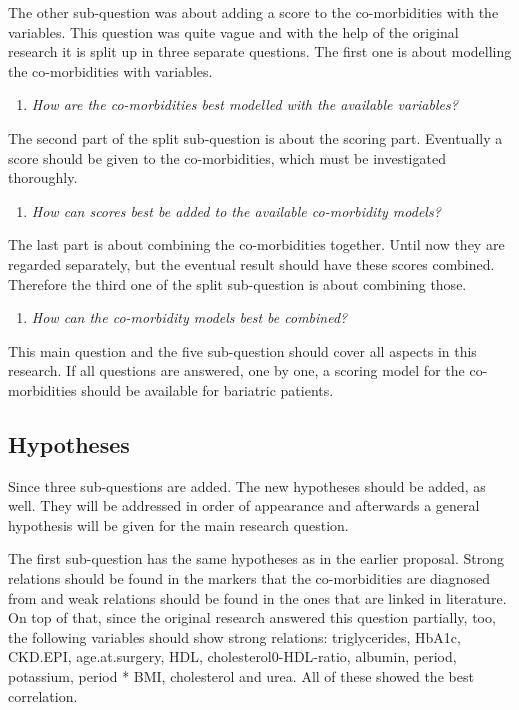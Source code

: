 \documentclass[10pt,a4paper]{article}
\begin{document}
	The other sub-question was about adding a score to the co-morbidities with the variables. This question was quite vague and with the help of the original research it is split up in three separate questions. The first one is about modelling the co-morbidities with variables.
	
	\begin{enumerate}[resume]
		\item \emph{How are the co-morbidities best modelled with the available variables?}
	\end{enumerate}
	
	The second part of the split sub-question is about the scoring part. Eventually a score should be given to the co-morbidities, which  must be investigated thoroughly.
	
	\begin{enumerate}[resume]
		\item \emph{How can scores best be added to the available co-morbidity models?}
	\end{enumerate}
	
	The last part is about combining the co-morbidities together. Until now they are regarded separately, but the eventual result should have these scores combined. Therefore the third one of the split sub-question is about combining those.
	
	\begin{enumerate}[resume]
		\item \emph{How can the co-morbidity models best be combined?}
	\end{enumerate}
	
	This main question and the five sub-question should cover all aspects in this research. If all questions are answered, one by one, a scoring model for the co-morbidities should be available for bariatric patients.
	
	\subsection{Hypotheses}
	
	Since three sub-questions are added. The new hypotheses should be added, as well. They will be addressed in order of appearance and afterwards a general hypothesis will be given for the main research question.
	
	The first sub-question has the same hypotheses as in the earlier proposal. Strong relations should be found in the markers that the co-morbidities are diagnosed from and weak relations should be found in the ones that are linked in literature. On top of that, since the original research answered this question partially, too, the following variables should show strong relations: triglycerides, HbA1c, CKD.EPI, age.at.surgery, HDL, cholesterol0-HDL-ratio, albumin, period, potassium, period * BMI, cholesterol and urea. All of these showed the best correlation.
	
\end{document}
